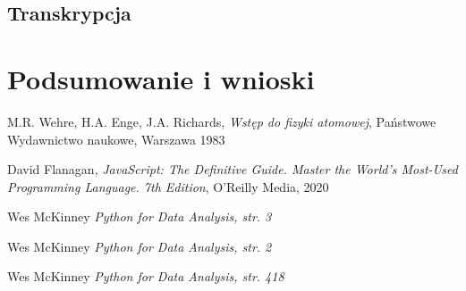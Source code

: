 \documentclass{SGGW-thesis}
\begin{document}
	\section{Transkrypcja}
	
\chapter{Podsumowanie i wnioski}


\begin{thebibliography}{9}
	M.R. Wehre, H.A. Enge, J.A. Richards,
	\textit{Wstęp do fizyki atomowej}, 
	Państwowe Wydawnictwo naukowe, Warszawa 1983
	
	David Flanagan, 
	\textit{JavaScript: The Definitive Guide. Master the World's Most-Used Programming Language. 7th Edition}, 
	O'Reilly Media, 2020
	
	Wes McKinney
	\textit{Python for Data Analysis, str. 3}
	
	Wes McKinney
	\textit{Python for Data Analysis, str. 2}
	
	Wes McKinney
	\textit{Python for Data Analysis, str. 418}
	
	
\end{thebibliography}

\beforelastpage
\end{document}
